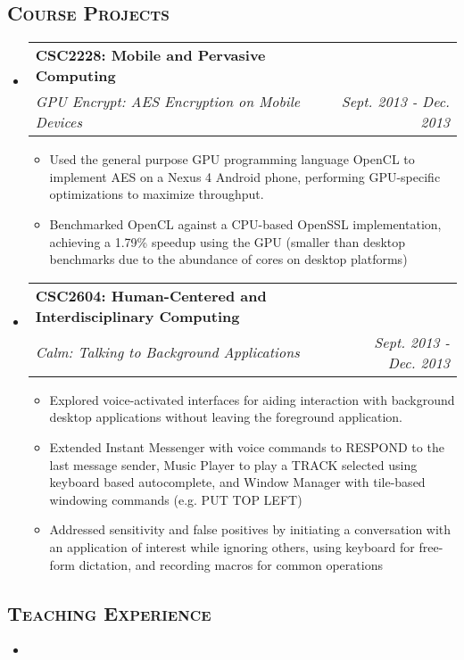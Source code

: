 \documentclass[letterpaper,11pt]{article}
\makeatletter
\newcommand{\BulletZeroLeftMargin}{1.5em}
\newcommand{\company}[1]{%
    \textbf{#1}
}
\newcommand{\heading}[1]{%
    \textsc{\textbf{#1}}
}
\newcommand*\resheading[1]{\subsection{\heading{#1}}\vspace{0.3em}\nopagebreak[4]}
\newcommand{\resitem}[1]{\item #1 \vspace{-2pt}}
\newcommand{\ressubheading}[4]{
\begin{tabular*}{6.5in}{l@{\extracolsep{\fill}}r}
    
		\company{#1} & #2 \\
		\textit{#3} & \textit{#4} \\
\end{tabular*}\vspace{-6pt}}
\makeatother
\begin{document}
\begin{minipage}{\textwidth}

\resheading{Course Projects}
\begin{itemize}[leftmargin=\BulletZeroLeftMargin]

\item

	\ressubheading{CSC2228: Mobile and Pervasive Computing}{}{GPU Encrypt: AES Encryption on Mobile Devices}{Sept. 2013 - Dec. 2013}
    \begin{itemize}[leftmargin=\BulletZeroLeftMargin]
		\resitem{
            Used the general purpose GPU programming language OpenCL to implement AES on a 
            Nexus 4 Android phone, performing GPU-specific optimizations to maximize 
            throughput.
        }
		\resitem{
            Benchmarked OpenCL against a CPU-based OpenSSL implementation, achieving a 
            1.79\% speedup using the GPU (smaller than desktop benchmarks due to the 
            abundance of cores on desktop platforms)
        }
	\end{itemize}

\item
	\ressubheading{CSC2604: Human-Centered and Interdisciplinary Computing}{}{Calm: Talking to Background Applications}{Sept. 2013 - Dec. 2013}
    \begin{itemize}[leftmargin=\BulletZeroLeftMargin]
		\resitem{
            Explored voice-activated interfaces for aiding interaction with background 
            desktop applications without leaving the foreground application.
        }
		\resitem{
            Extended Instant Messenger with voice commands to RESPOND to the last message 
            sender, Music Player to play a TRACK selected using keyboard based 
            autocomplete, and Window Manager with tile-based windowing commands (e.g. PUT 
            TOP LEFT)
        }
		\resitem{
            Addressed sensitivity and false positives by initiating a conversation with an
            application of interest while ignoring others, using keyboard for free-form 
            dictation, and recording macros for common operations
        }
	\end{itemize}

\end{itemize}

\resheading{Teaching Experience}
\begin{itemize}[leftmargin=\BulletZeroLeftMargin]
\item


\end{itemize}
\end{minipage}
\end{document}
